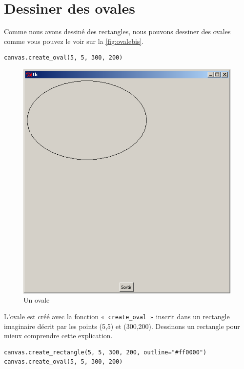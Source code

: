 \section{Dessiner des ovales}
Comme nous avons dessiné des rectangles, nous pouvons dessiner des ovales comme vous pouvez le voir sur la \autoref{fig:ovalebis}.

\begin{Verbatim}[frame=single,rulecolor=\color{mbleu}, label=à taper]
canvas.create_oval(5, 5, 300, 200)
\end{Verbatim}

\begin{figure}[h!]
\centering
\includegraphics[scale=0.4]{images/ovalebis}
\caption{Un ovale}\label{fig:ovalebis}
\end{figure}

L'ovale est créé avec la fonction «~\texttt{create\_oval}~» inscrit dans un rectangle imaginaire décrit par les points (5,5) et (300,200). Dessinons un rectangle pour mieux comprendre cette explication.

\begin{Verbatim}[frame=single,rulecolor=\color{mbleu}, label=à taper]
canvas.create_rectangle(5, 5, 300, 200, outline="#ff0000")
canvas.create_oval(5, 5, 300, 200)
\end{Verbatim}

